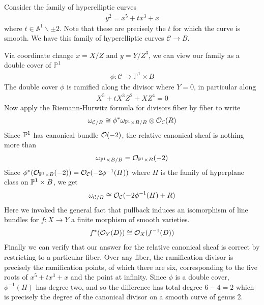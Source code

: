 \documentclass[12pt]{article}
\begin{document}
\begin{example}

    Consider the family of hyperelliptic curves \begin{align*}
        y^2 = x^5 + tx^3 + x
    \end{align*} where $t\in \mathbb{A}^1 \backslash {\pm 2}$. Note that these are precisely the $t$ for which the curve is smooth. We have this family of hyperelliptic curves $\mathcal{C} \to B$.

    Via coordinate change $x = X/Z$ and $y = Y/Z^3$, we can view our family as a double cover of $\mathbb{P}^1$ \begin{align*}
        \phi: \mathcal{C} \to \mathbb{P}^1 \times B
    \end{align*} The double cover $\phi$ is ramified along the divisor where $Y=0$, in particular along \begin{align*}
        X^5 + tX^3Z^2 + XZ^4 = 0
    \end{align*}
    Now apply the Riemann-Hurwitz formula for divisors fiber by fiber to write \begin{align*}
        \omega_{\mathcal{C}/B} \cong \phi^*\omega_{\mathbb{P}^1\times B/B} \otimes \cO_{\mathcal{C}}(R)
    \end{align*} Since $\P^1$ has canonical bundle $\cO(-2)$, the relative canonical sheaf is nothing more than \begin{align*}
        \omega_{\P^1\times B/B} = \cO_{\P^1\times B}(-2)
    \end{align*} Since $\phi^*(\cO_{\P^1\times B}(-2)) = \cO_{\mathcal{C}}(-2\phi^{-1}(H))$ where $H$ is the family of hyperplane class on $\P^1 \times B$, we get \begin{align*}
        \omega_{\mathcal{C}/B} \cong \cO_{\mathcal{C}}(-2\phi^{-1}(H) + R)
    \end{align*} Here we invoked the general fact that pullback induces an isomorphism of line bundles for $f:X\to Y$ a finite morphism of smooth varieties.
    \begin{align*}
        f^*(\cO_Y(D)) \cong \cO_X(f^{-1}(D))
    \end{align*}
    Finally we can verify that our answer for the relative canonical sheaf is correct by restricting to a particular fiber. Over any fiber, the ramification divisor is precisely the ramification points, of which there are six, corresponding to the five roots of $x^5 + tx^3 + x$ and the point at infinity. Since $\phi$ is a double cover, $\phi^{-1}(H)$ has degree two, and so the difference has total degree $6-4 = 2$ which is precisely the degree of the canonical divisor on a smooth curve of genus 2. 
\end{example}
\end{document}
